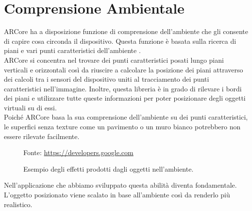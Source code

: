 \documentclass[crop=false, class=book]{standalone}
\begin{document}
	\section{Comprensione Ambientale}
	\label{sec:Enviromental_Understanding}
	ARCore ha a disposizione funzione di comprensione dell’ambiente che gli consente di capire cosa circonda il dispositivo. Questa funzione è basata sulla ricerca di piani e vari punti caratteristici dell’ambiente \cite{google2022fundamentals}. \\
	\noindent
	ARCore si concentra nel trovare dei punti caratteristici posati lungo piani verticali e orizzontali così da riuscire a calcolare la posizione dei piani attraverso dei calcoli tra i sensori del dispositivo uniti al tracciamento dei punti caratteristici nell’immagine.  Inoltre, questa libreria è in grado di rilevare i bordi dei piani e utilizzare tutte queste informazioni per poter posizionare degli oggetti virtuali su di essi.\\
	\noindent
	Poiché ARCore basa la sua comprensione dell’ambiente su dei punti caratteristici, le superfici senza texture come un pavimento o un muro bianco potrebbero non essere rilevate facilmente.

	\begin{center}
		\begin{figure}[htp]
			\centering
			{Fonte: \url{https://developers.google.com}}
			\caption{Esempio degli effetti prodotti dagli oggetti nell'ambiente.}
			\label{fig:env_und}
		\end{figure}
	\end{center}
	\noindent
	Nell'applicazione che abbiamo sviluppato questa abilità diventa fondamentale. L'oggetto posizionato viene scalato in base all'ambiente così da renderlo più realistico.
	
\end{document}
